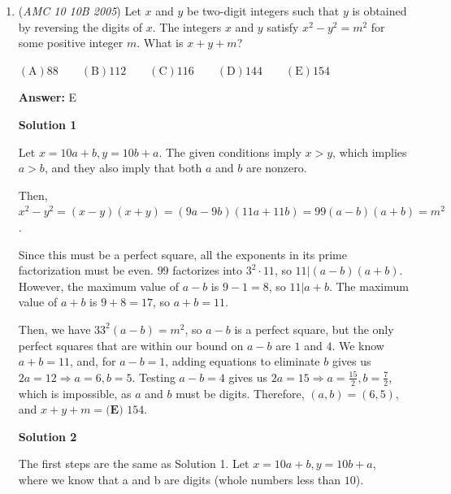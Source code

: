 \begin{enumerate}
 The smaller trapezoid has area $h$ while the larger trapezoid must have area $5h$. We have the equation $\frac {x}{2} = 5$. $x$ = 10, and our answer is $\boxed{\textbf{(C) }5}$




\textbf{Solution 4 (SIMPLE)}

By setting the area of $ABEF$ equal to $2$ times the area of $DCEF$, you get that $AB + FE = 2(DC + FE)$. Thus, $AB = 2DC + FE$. Note that $FE = DC + \frac{AB-DC}{2}$. From this, we get $AB = 2DC + DC + AB/2 - DC/2$. Simplifying, $AB/DC$ equals $\boxed{\textbf{(C) }5}$



	\item (\textit{AMC 10 10B 2005}) Let $x$ and $y$ be two-digit integers such that $y$ is obtained by reversing the digits
of $x$. The integers $x$ and $y$ satisfy $x^2 - y^2 = m^2$ for some positive integer $m$.
What is $x + y + m$?


 $\mathrm{(A)} 88 \qquad \mathrm{(B)} 112 \qquad \mathrm{(C)} 116 \qquad \mathrm{(D)} 144 \qquad \mathrm{(E)} 154$

 \textbf{Answer: }E



\textbf{Solution 1}

Let $x = 10a+b, y = 10b+a$. The given conditions imply $x>y$, which implies $a>b$, and they also imply that both $a$ and $b$ are nonzero. 

 Then, $x^2 - y^2 = (x-y)(x+y) = (9a - 9b)(11a + 11b) = 99(a-b)(a+b) = m^2$. 

 Since this must be a perfect square, all the exponents in its prime factorization must be even. $99$ factorizes into $3^2 \cdot 11$, so $11|(a-b)(a+b)$. However, the maximum value of $a-b$ is $9-1=8$, so $11|a+b$. The maximum value of $a+b$ is $9+8=17$, so $a+b=11$. 

 Then, we have $33^2(a-b) = m^2$, so $a-b$ is a perfect square, but the only perfect squares that are within our bound on $a-b$ are $1$ and $4$. We know $a+b=11$, and, for $a-b=1$, adding equations to eliminate $b$ gives us $2a=12 \Longrightarrow a=6, b=5$. Testing $a-b=4$ gives us $2a=15 \Longrightarrow a=\frac{15}{2}, b=\frac{7}{2}$, which is impossible, as $a$ and $b$ must be digits. Therefore, $(a,b) = (6,5)$, and $x+y+m=\boxed{\textbf{(E) }154}$.

 



\textbf{Solution 2}

The first steps are the same as Solution 1.  Let $x = 10a+b, y = 10b+a$, where we know that a and b are digits (whole numbers less than $10$).  


\end{enumerate}
